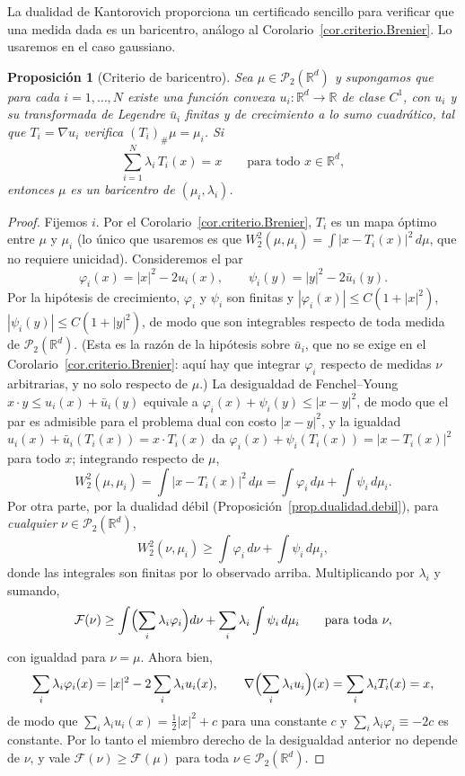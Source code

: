 \documentclass[12pt, a4paper]{amsbook}
\newcommand{\R}{{\mathbb R}}
\newtheorem{prop}[teo]{Proposición}
\theoremstyle{remark}
\theoremstyle{definition}
\numberwithin{section}{chapter}
\numberwithin{subsection}{section}
\numberwithin{equation}{section}
\numberwithin{figure}{chapter}
\begin{document}
La dualidad de Kantorovich proporciona un certificado sencillo para verificar
que una medida dada es un baricentro, análogo al
Corolario~\ref{cor.criterio.Brenier}. Lo usaremos en el caso gaussiano.

\begin{prop}[Criterio de baricentro]\label{prop.bar.criterio}
Sea $\mu\in\mathcal P_2(\R^d)$ y supongamos que para cada $i=1,\dots,N$ existe
una función convexa $u_i\colon\R^d\to\R$ de clase $C^1$, con $u_i$ y su
transformada de Legendre $\bar u_i$ finitas y de crecimiento a lo sumo
cuadrático, tal que $T_i=\nabla u_i$ verifica $(T_i)_\#\mu=\mu_i$. Si
\[
\sum_{i=1}^N\lambda_i\,T_i(x)=x
\qquad\text{para todo }x\in\R^d,
\]
entonces $\mu$ es un baricentro de $(\mu_i,\lambda_i)$.
\end{prop}

\begin{proof}
Fijemos $i$. Por el Corolario~\ref{cor.criterio.Brenier}, $T_i$ es un mapa
óptimo entre $\mu$ y $\mu_i$ (lo único que usaremos es que
$W_2^2(\mu,\mu_i)=\int|x-T_i(x)|^2\,d\mu$, que no requiere unicidad).
Consideremos el par
\[
\varphi_i(x)=|x|^2-2u_i(x),
\qquad
\psi_i(y)=|y|^2-2\bar u_i(y).
\]
Por la hipótesis de crecimiento, $\varphi_i$ y $\psi_i$ son finitas y
$|\varphi_i(x)|\le C(1+|x|^2)$, $|\psi_i(y)|\le C(1+|y|^2)$, de modo que son
integrables respecto de toda medida de $\mathcal P_2(\R^d)$. (Esta es la
razón de la hipótesis sobre $\bar u_i$, que no se exige en el
Corolario~\ref{cor.criterio.Brenier}: aquí hay que integrar $\varphi_i$
respecto de medidas $\nu$ arbitrarias, y no solo respecto de $\mu$.) La
desigualdad de Fenchel--Young $x\cdot y\le u_i(x)+\bar u_i(y)$ equivale a
$\varphi_i(x)+\psi_i(y)\le|x-y|^2$, de modo que el par es admisible para el
problema dual con costo $|x-y|^2$, y la igualdad
$u_i(x)+\bar u_i(T_i(x))=x\cdot T_i(x)$ da
$\varphi_i(x)+\psi_i(T_i(x))=|x-T_i(x)|^2$ para todo $x$; integrando
respecto de $\mu$,
\[
W_2^2(\mu,\mu_i)=\int|x-T_i(x)|^2\,d\mu=\int\varphi_i\,d\mu+\int\psi_i\,d\mu_i.
\]
Por otra
parte, por la dualidad débil (Proposición~\ref{prop.dualidad.debil}), para
\emph{cualquier} $\nu\in\mathcal P_2(\R^d)$,
\[
W_2^2(\nu,\mu_i)\ge\int\varphi_i\,d\nu+\int\psi_i\,d\mu_i,
\]
donde las integrales son finitas por lo observado arriba. Multiplicando por
$\lambda_i$ y sumando,
\[
\mathcal F(\nu)
\ge\int\Bigl(\sum_i\lambda_i\varphi_i\Bigr)d\nu+\sum_i\lambda_i\int\psi_i\,d\mu_i
\qquad\text{para toda }\nu,
\]
con igualdad para $\nu=\mu$. Ahora bien,
\[
\sum_i\lambda_i\varphi_i(x)=|x|^2-2\sum_i\lambda_iu_i(x),
\qquad
\nabla\Bigl(\sum_i\lambda_iu_i\Bigr)(x)=\sum_i\lambda_iT_i(x)=x,
\]
de modo que $\sum_i\lambda_iu_i(x)=\tfrac12|x|^2+c$ para una constante $c$ y
$\sum_i\lambda_i\varphi_i\equiv-2c$ es constante. Por lo tanto el miembro
derecho de la desigualdad anterior no depende de $\nu$, y vale
$\mathcal F(\nu)\ge\mathcal F(\mu)$ para toda $\nu\in\mathcal P_2(\R^d)$.
\end{proof}
\end{document}
